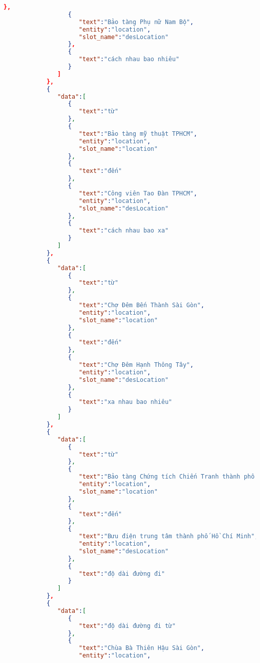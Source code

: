 \begin{lstlisting}[language=json,firstnumber=1]
                  },
                  {
                     "text":"Bảo tàng Phụ nữ Nam Bộ",
                     "entity":"location",
                     "slot_name":"desLocation"
                  },
                  {
                     "text":"cách nhau bao nhiêu"
                  }
               ]
            },
            {
               "data":[
                  {
                     "text":"từ"
                  },
                  {
                     "text":"Bảo tàng mỹ thuật TPHCM",
                     "entity":"location",
                     "slot_name":"location"
                  },
                  {
                     "text":"đến"
                  },
                  {
                     "text":"Công viên Tao Đàn TPHCM",
                     "entity":"location",
                     "slot_name":"desLocation"
                  },
                  {
                     "text":"cách nhau bao xa"
                  }
               ]
            },
            {
               "data":[
                  {
                     "text":"từ"
                  },
                  {
                     "text":"Chợ Đêm Bến Thành Sài Gòn",
                     "entity":"location",
                     "slot_name":"location"
                  },
                  {
                     "text":"đến"
                  },
                  {
                     "text":"Chợ Đêm Hạnh Thông Tây",
                     "entity":"location",
                     "slot_name":"desLocation"
                  },
                  {
                     "text":"xa nhau bao nhiêu"
                  }
               ]
            },
            {
               "data":[
                  {
                     "text":"từ"
                  },
                  {
                     "text":"Bảo tàng Chứng tích Chiến Tranh thành phố Hồ Chí Minh",
                     "entity":"location",
                     "slot_name":"location"
                  },
                  {
                     "text":"đến"
                  },
                  {
                     "text":"Bưu điện trung tâm thành phố Hồ Chí Minh",
                     "entity":"location",
                     "slot_name":"desLocation"
                  },
                  {
                     "text":"độ dài đường đi"
                  }
               ]
            },
            {
               "data":[
                  {
                     "text":"độ dài đường đi từ"
                  },
                  {
                     "text":"Chùa Bà Thiên Hậu Sài Gòn",
                     "entity":"location",

\end{lstlisting}
